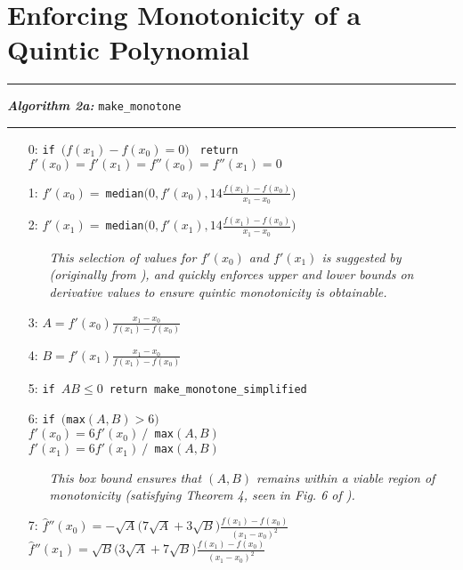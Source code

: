 \documentclass{article}
\begin{document}
\section{Enforcing Monotonicity of a Quintic Polynomial}


\vspace{10pt}
\hrule
\vspace{3pt}
\noindent\textbf{\textit{Algorithm 2a:}} \texttt{make\_monotone}
\vspace{3pt}
\hrule

\begin{itemize}
  \itemsep0pt
  \parskip0pt

\item[0:] \texttt{if }$\big(f(x_1) - f(x_0) = 0\big)$ \texttt{ return } $f'(x_0) = f'(x_1) = f''(x_0) = f''(x_1) = 0$
\item[1:] $f'(x_0) = \ $\texttt{median}$\big(0, f'(x_0), 14 \frac{f(x_1) - f(x_0)}{x_1 - x_0} \big)$
\item[2:] $f'(x_1) = \ $\texttt{median}$\big(0, f'(x_1), 14 \frac{f(x_1) - f(x_0)}{x_1 - x_0}\big)$
  \begin{itemize}
  \item[] \textit{This selection of values for $f'(x_0)$ and $f'(x_1)$ is suggested by \cite{ulrich1994positivity} (originally from \cite{huynh1993accurate}), and quickly enforces upper and lower bounds on derivative values to ensure quintic monotonicity is obtainable.}
  \end{itemize}
\item[3:] $A = f'(x_0)\frac{x_1 - x_0}{f(x_1) - f(x_0)}$
\item[4:] $B = f'(x_1) \frac{x_1 - x_0}{f(x_1) - f(x_0)}$
\item[5:] \texttt{if }$AB \leq 0$\texttt{ return make\_monotone\_simplified}
\item[6:] \texttt{if $\big($max}$(A,B) > 6\big)$\\$f'(x_0) = 6 f'(x_0)\  /$\texttt{ max}$(A,B)$\\$f'(x_1) = 6 f'(x_1)\  /$\texttt{ max}$(A,B)$

  \begin{itemize}
  \item[] \textit{This box bound ensures that $(A,B)$ remains within a viable region of monotonicity (satisfying Theorem 4, seen in Fig. 6 of \cite{ulrich1994positivity}).}
  \end{itemize}

\item[7:] $\hat f''(x_0) = - \sqrt{A} \big( 7 \sqrt{A} + 3 \sqrt{B} \big) \frac{f(x_1) - f(x_0)}{(x_1 - x_0)^2}$\\$\hat f''(x_1) = \sqrt{B} \big( 3 \sqrt{A} + 7 \sqrt{B} \big) \frac{f(x_1) - f(x_0)}{(x_1 - x_0)^2}$


\end{itemize}
\end{document}
